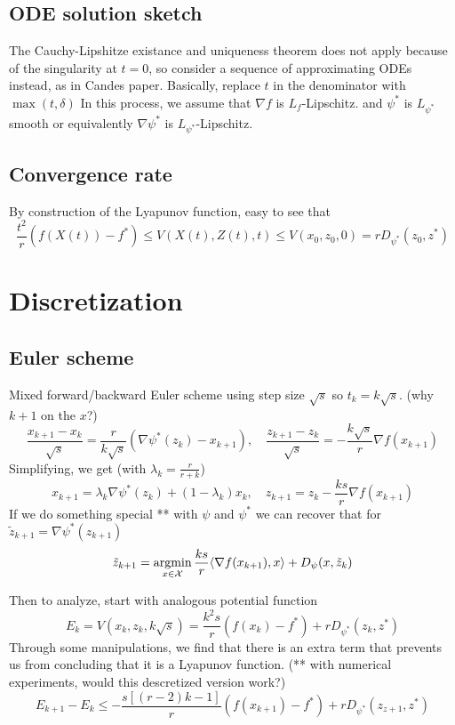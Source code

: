 \subsection{ODE solution sketch}
The Cauchy-Lipshitze existance and uniqueness theorem does not apply because of the singularity at $t=0$, so consider a sequence of approximating ODEs instead, as in Candes paper. Basically, replace $t$ in the denominator with $\max (t,\delta)$ In this process, we assume that $\nabla f$ is $L_f$-Lipschitz. and $\psi^*$ is $L_{\psi^*}$ smooth or equivalently $\nabla \psi^*$ is $L_{\psi^*}$-Lipschitz.

\subsection{Convergence rate}
By construction of the Lyapunov function, easy to see that
\[ \frac{t^2}{r} (f(X(t)) - f^*) \leq V(X(t),Z(t),t) \leq  V(x_0,z_0,0)  = rD_{\psi^*}(z_0,z^*) \]

\section{Discretization}
\subsection{Euler scheme}
Mixed forward/backward Euler scheme using step size $\sqrt{s}$ so $t_k = k\sqrt{s}$. (why $k+1$ on the $x$?)
\[ \frac{x_{k+1} - x_k}{\sqrt{s}} = \frac{r}{k\sqrt{s}} (\nabla \psi^*(z_k) - x_{k+1}),\quad \frac{z_{k+1} - z_k}{\sqrt{s}} = -\frac{k\sqrt{s}}{r} \nabla f(x_{k+1}) \]
Simplifying, we get (with $\lambda_k = \frac{r}{r+k}$)
\[ x_{k+1}  = \lambda_k \nabla \psi^*(z_k) + (1-\lambda_k) x_{k}, \quad z_{k+1} = z_k -\frac{ks}{r} \nabla f(x_{k+1}) \]
If we do something special ** with $\psi$ and $\psi^*$ we can recover that for $\tilde z_{k+1} = \nabla \psi^*(z_{k+1} )$
\[ \tilde z_{k+1} = \argmin_{x\in\mathcal{X}} \frac{ks}{r} \langle \nabla f(x_{k+1}), x \rangle + D_\psi (x, \tilde z_k)\]

Then to analyze, start with analogous potential function
\[E_k = V(x_k, z_k, k\sqrt{s}) = \frac{k^2s}{r} (f(x_k) - f^*) + rD_{\psi^*}(z_k,z^*)\]
Through some manipulations, we find that there is an extra term that prevents us from concluding that it is a Lyapunov function. (** with numerical experiments, would this descretized version work?)
\[ E_{k+1} - E_k \leq -\frac{s[(r-2)k-1]}{r} (f(x_{k+1}) - f^*) + rD_{\psi^*}(z_{z+1},z^*) \]

